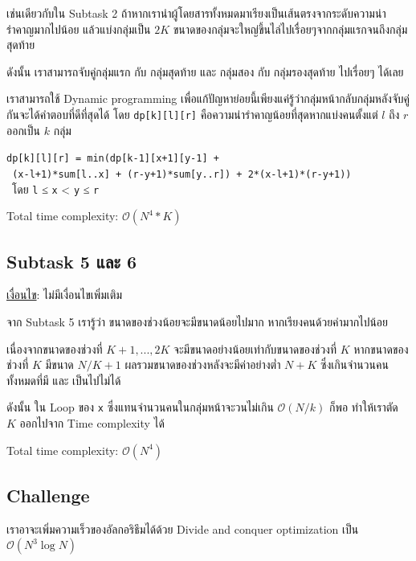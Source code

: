 \documentclass[12pt]{article}
\newcommand{\code}[1]{\texttt{\scriptsize{#1}}}
\begin{document}
เช่นเดียวกับใน Subtask 2 ถ้าหากเรานำผู้โดยสารทั้งหมดมาเรียงเป็นเส้นตรงจากระดับความน่ารำคาญมากไปน้อย แล้วแบ่งกลุ่มเป็น $2K$ ขนาดของกลุ่มจะใหญ่ขึ้นไล่ไปเรื่อยๆจากกลุ่มแรกจนถึงกลุ่มสุดท้าย

ดังนั้น เราสามารถจับคู่กลุ่มแรก กับ กลุ่มสุดท้าย และ กลุ่มสอง กับ กลุ่มรองสุดท้าย ไปเรื่อยๆ ได้เลย

เราสามารถใช้ Dynamic programming เพื่อแก้ปัญหาย่อยนี้เพียงแค่รู้ว่ากลุ่มหน้ากลับกลุ่มหลังจับคู่กันจะได้คำตอบที่ดีที่สุดได้ โดย \code{dp[k][l][r]} คือความน่ารำคาญน้อยที่สุดหากแบ่งคนตั้งแต่ $l$ ถึง $r$ ออกเป็น $k$ กลุ่ม

\begin{center}
\code{dp[k][l][r] = min(dp[k-1][x+1][y-1] + \\\ (x-l+1)*sum[l..x] + (r-y+1)*sum[y..r]) + 2*(x-l+1)*(r-y+1))} \\\
โดย \code{l} ≤ \code{x} < \code{y} ≤ \code{r}
\end{center}

Total time complexity: $\mathcal{O}(N^4*K)$


\subsection{Subtask 5 และ 6}

\underline{เงื่อนไข}: ไม่มีเงื่อนไขเพิ่มเติม

จาก Subtask 5 เรารู้ว่า ขนาดของช่วงน้อยจะมีขนาดน้อยไปมาก หากเรียงคนด้วยค่ามากไปน้อย


เนื่องจากขนาดของช่วงที่ $K+1, ..., 2K$ จะมีขนาดอย่างน้อยเท่ากับขนาดของช่วงที่ $K$ หากขนาดของช่วงที่ $K$ มีขนาด $N/K + 1$ ผลรวมขนาดของช่วงหลังจะมีค่าอย่างต่ำ $N + K$ ซึ่งเกินจำนวนคนทั้งหมดที่มี และ เป็นไปไม่ได้

ดังนั้น ใน Loop ของ \code{x} ซึ่งแทนจำนวนคนในกลุ่มหน้าจะวนไม่เกิน $\mathcal{O}(N/k)$ ก็พอ ทำให้เราตัด $K$ ออกไปจาก Time complexity ได้

Total time complexity: $\mathcal{O}(N^4)$

\subsection{Challenge}

เราอาจะเพิ่มความเร็วของอัลกอริธึมได้ด้วย Divide and conquer optimization เป็น $\mathcal{O}(N^3 \log N)$

\newpage
\end{document}
